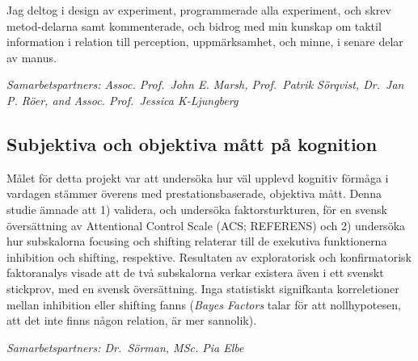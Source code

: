 \documentclass[]{article}
\begin{document}
Jag deltog i design av experiment, programmerade alla experiment, och
skrev metod-delarna samt kommenterade, och bidrog med min kunskap om
taktil information i relation till perception, uppmärksamhet, och minne,
i senare delar av manus.

\emph{Samarbetspartners: Assoc. Prof.~John E. Marsh, Prof.~Patrik
Sörqvist, Dr.~Jan P. Röer, and Assoc. Prof.~Jessica K-Ljungberg}

\subsection{Subjektiva och objektiva mått på
kognition}\label{subjektiva-och-objektiva-matt-pa-kognition}

Målet för detta projekt var att undersöka hur väl upplevd kognitiv
förmåga i vardagen stämmer överens med prestationsbaserade, objektiva
mått. Denna studie ämnade att 1) validera, och undersöka
faktorsturkturen, för en svensk översättning av Attentional Control
Scale (ACS; REFERENS) och 2) undersöka hur subskalorna focusing och
shifting relaterar till de exekutiva funktionerna inhibition och
shifting, respektive. Resultaten av exploratorisk och konfirmatorisk
faktoranalys visade att de två subskalorna verkar existera även i ett
svenskt stickprov, med en svensk översättning. Inga statistiskt
signifkanta korreletioner mellan inhibition eller shifting fanns
(\emph{Bayes Factors} talar för att nollhypotesen, att det inte finns
någon relation, är mer sannolik).

\emph{Samarbetspartners: Dr.~Sörman, MSc. Pia Elbe}
\end{document}
